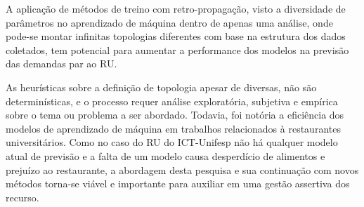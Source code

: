         A aplicação de métodos de treino com retro-propagação, visto a diversidade de parâmetros no aprendizado de máquina dentro de apenas uma análise, onde pode-se montar infinitas topologias diferentes com base na estrutura dos dados coletados, tem potencial para aumentar a performance dos modelos na previsão das demandas par ao RU. 
        
        As heurísticas sobre a definição de topologia apesar de diversas, não são determinísticas, e o processo requer análise exploratória, subjetiva e empírica sobre o tema ou problema a ser abordado. Todavia, foi notória a eficiência dos modelos de aprendizado de máquina em trabalhos relacionados à restaurantes universitários. Como no caso do RU do ICT-Unifesp não há qualquer modelo atual de previsão e a falta de um modelo causa desperdício de alimentos e prejuízo ao restaurante, a abordagem desta pesquisa e sua continuação com novos métodos torna-se viável e importante para auxiliar em uma gestão assertiva dos recurso.